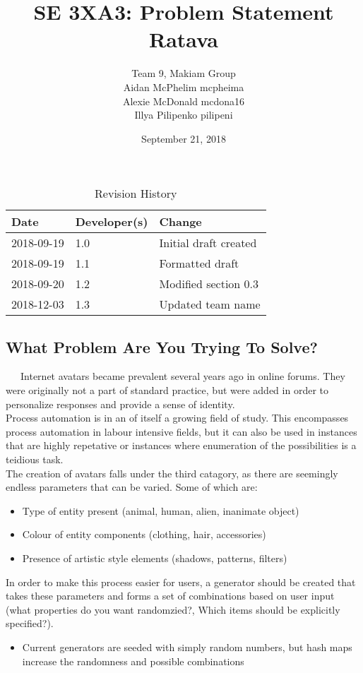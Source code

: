 \documentclass{article}
\title{SE 3XA3: Problem Statement\\Ratava}
\author{Team 9, Makiam Group
		\\ Aidan McPhelim \- mcpheima
		\\ Alexie McDonald \- mcdona16
		\\ Illya Pilipenko \- pilipeni
}
\date{September 21, 2018}
\begin{document}
\begin{table}[hp]
\caption{Revision History} \label{TblRevisionHistory}
\begin{tabularx}{\textwidth}{llX}
\toprule
\textbf{Date} & \textbf{Developer(s)} & \textbf{Change}\\
\midrule
2018-09-19 & 1.0 & Initial draft created\\
2018-09-19 & 1.1 & Formatted draft\\
2018-09-20 & 1.2 & Modified section 0.3\\
2018-12-03 & 1.3 & Updated team name\\
\bottomrule
\end{tabularx}
\end{table}

\newpage

\maketitle

\subsection{What Problem Are You Trying To Solve?}
\ \ \ Internet avatars became prevalent several years ago in online forums. They were originally not a part of standard practice, but were added in order to personalize responses and provide a sense of identity. \\

Process automation is in an of itself a growing field of study. This encompasses process automation in labour intensive fields, but it can also be used in instances that are highly repetative or instances where enumeration of the possibilities is a teidious task. \\

The creation of avatars falls under the third catagory, as there are seemingly endless parameters that can be varied. Some of which are:
\begin{itemize}
\item{Type of entity present (animal, human, alien, inanimate object)}
\item{Colour of entity components (clothing, hair, accessories)}
\item{Presence of artistic style elements (shadows, patterns, filters)}
\end{itemize}
In order to make this process easier for users,  a generator should be created that takes these parameters and forms a set of combinations based on user input (what properties do you want randomzied?, Which items should be explicitly specified?).
\begin{itemize}
\item{Current generators are seeded with simply random numbers, but hash maps increase the randomness and possible combinations}
\end{itemize}
\end{document}

